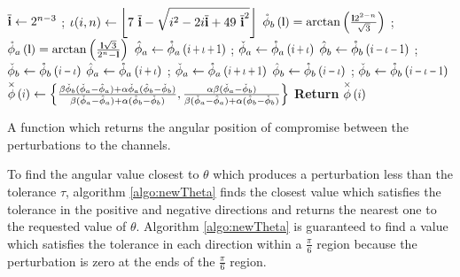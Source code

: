  \begin{algorithm}[h]
 \begin{algorithmic}
       
       \State $\overline{\mathbf{i}} \gets  2^{n-3}$  ; \quad  $\iota(i,n)  \gets  \left\lfloor 7\ \meanIndx-\sqrt{i^2 - 2 i \meanIndx + 49\ \meanIndx^2 }\right\rfloor $  
        \State $\extremaTheta{b}{\mathbf{l} } = \arctan\left(\frac{\mathbf{l} 2^{2-n}}{\sqrt{3}}       \right)$ ; \quad 
        $\extremaTheta{a}{\mathbf{l} } = \arctan\left(\frac{\mathbf{l} \sqrt{3} }{2^n - \mathbf{l}}\right)$
          
               \State   $\maximaTheta{a} \gets \extremaTheta{a}{i+\iota+1}  $ ;\quad
                 $\minimaTheta{a}  \gets \extremaTheta{a}{i+\iota} $ 
               \State   $\maximaTheta{b} \gets \extremaTheta{b}{i-\iota-1} $ ;\quad
                 $\minimaTheta{b}  \gets \extremaTheta{b}{i-\iota}  $
         \Else
                \State  $\maximaTheta{a}  \gets \extremaTheta{a}{i+\iota} $ ;\quad
                 $\minimaTheta{a}  \gets \extremaTheta{a}{i+\iota+1}  $ \;
                \State  $\maximaTheta{b} \gets \extremaTheta{b}{i-\iota}  $ ;\quad
                 $\minimaTheta{b}  \gets \extremaTheta{b} {i-\iota-1} $ \;
         \EndIf
       \State  $\thetaX{i} \gets \left\{\frac{
        \beta \minimaTheta{b} (\minimaTheta{a}  -\maximaTheta{a} )+\alpha  \minimaTheta{a} (\maximaTheta{b}-\minimaTheta{b})  }{
        \beta  (\minimaTheta{a} -\maximaTheta{a})+\alpha  (\maximaTheta{b}-\minimaTheta{b})
        },\frac{
        \alpha  \beta  (\minimaTheta{a}-\minimaTheta{b})  }{
        \beta  (\minimaTheta{a}-\maximaTheta{a})+\alpha  (\maximaTheta{b}-\minimaTheta{b})
        }\right\} $ \;
      \State \textbf{Return} {$\thetaX{i}$}
\EndFunction
 \end{algorithmic}
    \caption{A function which returns the angular position of compromise between the perturbations to the channels.}
    \label{algo:thetaX}
\end{algorithm}

To find the angular value closest to $\theta$ which produces a perturbation less than the tolerance $\tau$, algorithm \ref{algo:newTheta} finds the closest value which satisfies the tolerance in the positive and negative directions and returns the nearest one to the requested value of $\theta$. Algorithm \ref{algo:newTheta} is guaranteed to find a value which satisfies the tolerance in each direction within a $\frac{\pi}{6}$ region because the perturbation is zero at the ends of the $\frac{\pi}{6}$ region.
 

